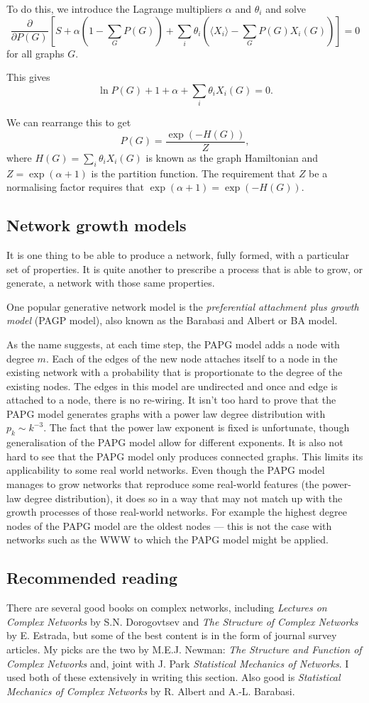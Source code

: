 \documentclass{article}
\begin{document}
To do this, we introduce the Lagrange multipliers $\alpha$ and $\theta_i$ and solve
$$
	\frac{\partial}{\partial P(G)}\left[S + \alpha \left(1-\sum_G P(G)\right) + \sum_i \theta_i \left(\langle X_i \rangle - \sum_G P(G)X_i(G)\right) \right] = 0
$$
for all graphs $G$.

This gives
$$
	\ln P(G) +1 +\alpha +\sum_i\theta_iX_i(G) = 0.
$$

We can rearrange this to get
$$
	P(G) = \frac{\exp(-H(G))}{Z},
$$
where $H(G) = \sum_i\theta_iX_i(G)$ is known as the graph Hamiltonian and $Z = \exp(\alpha+1)$ is the partition function. The requirement that $Z$ be a normalising factor requires that $\exp(\alpha+1) = \exp(-H(G))$.

\subsection*{Network growth models}
It is one thing to be able to produce a network, fully formed, with a particular set of properties. It is quite another to prescribe a process that is able to grow, or generate, a network with those same properties.

One popular generative network model is the \emph{preferential attachment plus growth model} (PAGP model), also known as the Barabasi and Albert or BA model.

As the name suggests, at each time step, the PAPG model adds a node with degree $m$. Each of the edges of the new node attaches itself to a node in the existing network with a probability that is proportionate to the degree of the existing nodes. The edges in this model are undirected and once and edge is attached to a node, there is no re-wiring. It isn't too hard to prove that the PAPG model generates graphs with a power law degree distribution with $p_k \sim k^{-3}$. The fact that the power law exponent is fixed is unfortunate, though generalisation of the PAPG model allow for different exponents. It is also not hard to see that the PAPG model only produces connected graphs. This limits its applicability to some real world networks. Even though the PAPG model manages to grow networks that reproduce some real-world features (the power-law degree distribution), it does so in a way that may not match up with the growth processes of those real-world networks. For example the highest degree nodes of the PAPG model are the oldest nodes --- this is not the case with networks such as the WWW to which the PAPG model might be applied.

\subsection*{Recommended reading}
There are several good books on complex networks, including \emph{Lectures on Complex Networks} by S.N. Dorogovtsev and \emph{The Structure of Complex Networks} by E. Estrada, but some of the best content is in the form of journal survey articles. My picks are the two by M.E.J. Newman: \emph{The Structure and Function of Complex Networks} and, joint with J. Park \emph{Statistical Mechanics of Networks}. I used both of these extensively in writing this section. Also good is \emph{Statistical Mechanics of Complex Networks} by R. Albert and A.-L. Barabasi.
\end{document}
